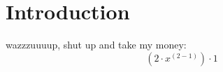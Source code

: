 \documentclass{article}
\begin{document}
\section{Introduction}
wazzzuuuup, shut up and take my money:$$  {  (  {  2  }  \cdot  {  {  x  }  ^  {  (  {  2  }  -  {  1  }  )  }  }  )  }  \cdot  {  1  }  $$
\end{document}
